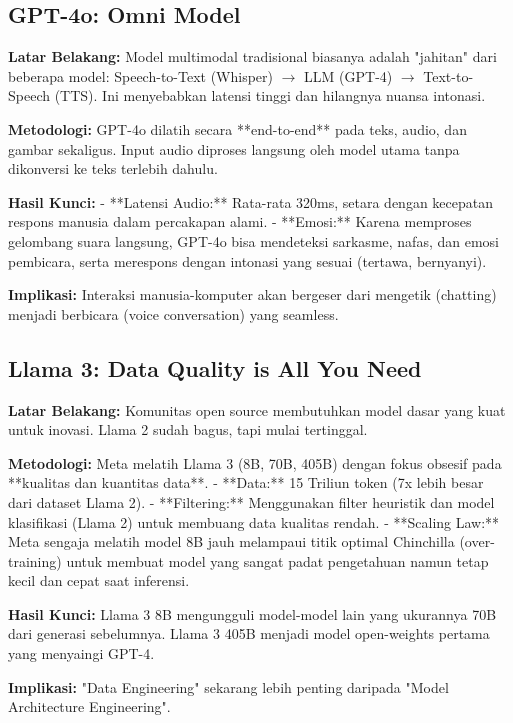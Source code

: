 \subsection{GPT-4o: Omni Model \cite{achiam2023gpt4}}

\textbf{Latar Belakang:}
Model multimodal tradisional biasanya adalah "jahitan" dari beberapa model: Speech-to-Text (Whisper) $\to$ LLM (GPT-4) $\to$ Text-to-Speech (TTS). Ini menyebabkan latensi tinggi dan hilangnya nuansa intonasi.

\textbf{Metodologi:}
GPT-4o dilatih secara **end-to-end** pada teks, audio, dan gambar sekaligus. Input audio diproses langsung oleh model utama tanpa dikonversi ke teks terlebih dahulu.

\textbf{Hasil Kunci:}
- **Latensi Audio:** Rata-rata 320ms, setara dengan kecepatan respons manusia dalam percakapan alami.
- **Emosi:** Karena memproses gelombang suara langsung, GPT-4o bisa mendeteksi sarkasme, nafas, dan emosi pembicara, serta merespons dengan intonasi yang sesuai (tertawa, bernyanyi).

\textbf{Implikasi:}
Interaksi manusia-komputer akan bergeser dari mengetik (chatting) menjadi berbicara (voice conversation) yang seamless.

\subsection{Llama 3: Data Quality is All You Need \cite{touvron2024llama3}}

\textbf{Latar Belakang:}
Komunitas open source membutuhkan model dasar yang kuat untuk inovasi. Llama 2 sudah bagus, tapi mulai tertinggal.

\textbf{Metodologi:}
Meta melatih Llama 3 (8B, 70B, 405B) dengan fokus obsesif pada **kualitas dan kuantitas data**.
- **Data:** 15 Triliun token (7x lebih besar dari dataset Llama 2).
- **Filtering:** Menggunakan filter heuristik dan model klasifikasi (Llama 2) untuk membuang data kualitas rendah.
- **Scaling Law:** Meta sengaja melatih model 8B jauh melampaui titik optimal Chinchilla (over-training) untuk membuat model yang sangat padat pengetahuan namun tetap kecil dan cepat saat inferensi.

\textbf{Hasil Kunci:}
Llama 3 8B mengungguli model-model lain yang ukurannya 70B dari generasi sebelumnya. Llama 3 405B menjadi model open-weights pertama yang menyaingi GPT-4.

\textbf{Implikasi:}
"Data Engineering" sekarang lebih penting daripada "Model Architecture Engineering".

